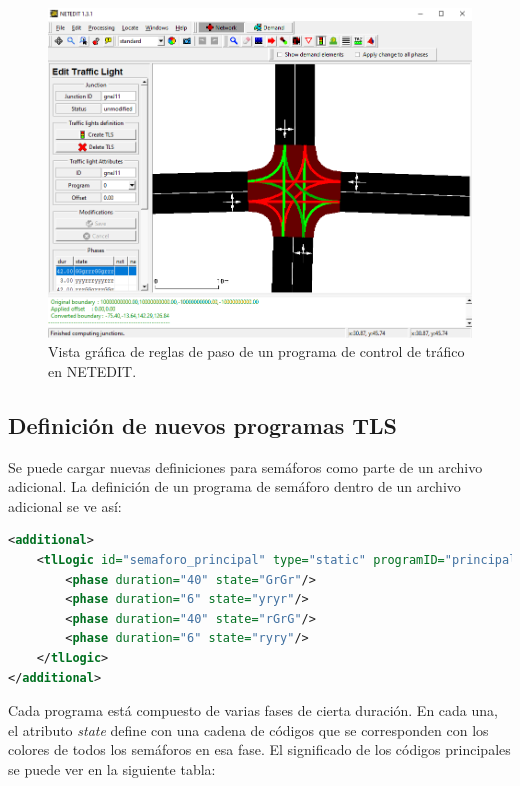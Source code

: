 \begin{figure}[H]
    \centering
\includegraphics[width=\textwidth]{sumo/e760085ba60c72e71c15ed1d0d5ab9aa.png}
    \caption{Vista gráfica de reglas de paso de un programa de control de
    tráfico en NETEDIT.}
    \label{fig:netedit3}
\end{figure}

\hypertarget{definiciuxf3n-de-nuevos-programas-tls}{%
\subsection{Definición de nuevos programas
TLS}\label{definiciuxf3n-de-nuevos-programas-tls}}

Se puede cargar nuevas definiciones para semáforos como parte de un
archivo adicional. La definición de un programa de semáforo dentro de un
archivo adicional se ve así:

\begin{lstlisting}[language=XML]
<additional>
    <tlLogic id="semaforo_principal" type="static" programID="principal" offset="0">
        <phase duration="40" state="GrGr"/>
        <phase duration="6" state="yryr"/>
        <phase duration="40" state="rGrG"/>
        <phase duration="6" state="ryry"/>
    </tlLogic>
</additional>
\end{lstlisting}

Cada programa está compuesto de varias fases de cierta duración. En cada
una, el atributo \emph{state} define con una cadena de códigos que se
corresponden con los colores de todos los semáforos en esa fase. El
significado de los códigos principales se puede ver en la siguiente
tabla:

